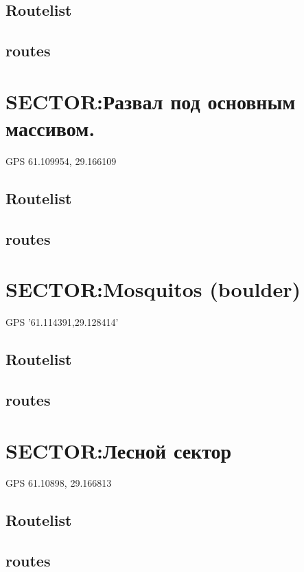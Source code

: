 \documentclass[8pt, a5paper,notitlepage,openany]{report}
\begin{document}
\section*{Routelist}

\newpage
\section*{routes}


\clearpage 
\chapter{SECTOR:Развал под основным массивом.}
 GPS 61.109954, 29.166109
\section*{Routelist}

\newpage
\section*{routes}



\clearpage 
\chapter{SECTOR:Mosquitos (boulder)}
 GPS '61.114391,29.128414'
\section*{Routelist}

\newpage
\section*{routes}


\clearpage 
\chapter{SECTOR:Лесной сектор}
 GPS 61.10898, 29.166813
\section*{Routelist}

\newpage
\section*{routes}

\end{document}
